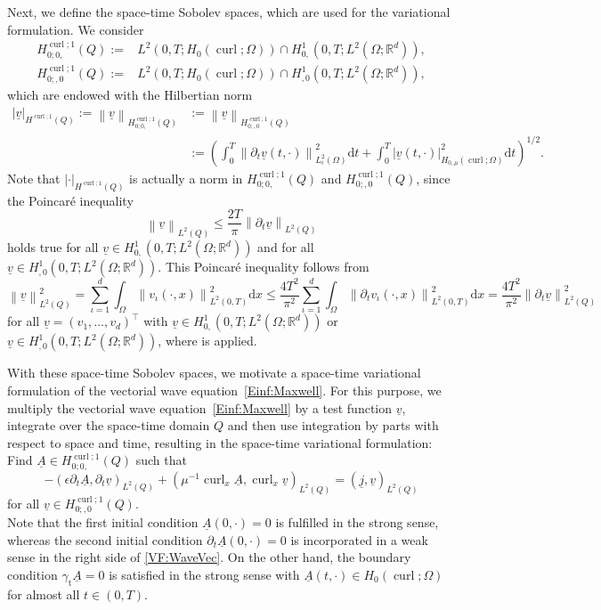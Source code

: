 \documentclass[a4paper,11pt]{article}
\newcommand{\R}{\mathbb R}
\newcommand{\cu}{\operatorname{curl}}
\newcommand{\trt}{\gamma_\mathrm{t}}
\renewcommand{\vec}[1]{\underline{#1}}
\newcommand{\abs}[1]{\left\lvert{#1}\right\rvert}
\newcommand{\norm}[1]{{\left\lVert{#1}\right\rVert}}
\begin{document}
Next, we define the space-time Sobolev spaces, which are used for the variational formulation. We consider
\begin{align}
	H^{\cu;1}_{0;0,}(Q) :=& L^2(0,T;H_0(\cu;\Omega))\cap H^1_{0,}(0,T;L^2(\Omega;\R^d)), \label{VF:Ansatzraum} \\
	H^{\cu;1}_{0;,0}(Q) :=& L^2(0,T;H_0(\cu;\Omega))\cap H^1_{,0}(0,T;L^2(\Omega;\R^d)), \label{VF:Testraum}
\end{align}
which are endowed with the Hilbertian norm
\begin{align*}
	\abs{\vec v}_{H^{\cu;1}(Q)} := \norm{\vec v}_{H^{\cu;1}_{0;0,}(Q)} &:= \norm{\vec v}_{H^{\cu;1}_{0;,0}(Q)} \\
	&:= \left( \int_0^T \norm{ \partial_t \vec v(t,\cdot) }_{{L^2_\epsilon(\Omega)}}^2 \mathrm dt + \int_0^T \abs{\vec v(t,\cdot)}_{H_{0,\mu}(\cu;\Omega)}^2 \mathrm dt \right)^{1/2}.
\end{align*}
Note that $\abs{\cdot}_{H^{\cu;1}(Q)}$ is actually a norm in $H^{\cu;1}_{0;0,}(Q)$ and $H^{\cu;1}_{0;,0}(Q)$, since the Poincaré inequality
\begin{equation*}
	\norm{\vec v}_{L^2(Q)} \leq \frac{2 T}{\pi} \norm{\partial_t \vec v}_{L^2(Q)}
\end{equation*}
holds true for all $\vec v \in  H^1_{0,}(0,T;L^2(\Omega;\R^d))$ and for all $\vec v \in  H^1_{,0}(0,T;L^2(\Omega;\R^d))$. This Poincaré inequality follows from
\begin{equation*}
	\norm{ \vec v }_{L^2(Q)}^2 = \sum_{\iota=1}^d \int_\Omega \norm{v_\iota(\cdot,x)}_{L^2(0,T)}^2 \mathrm dx \leq \frac{4 T^2}{\pi^2} \sum_{\iota=1}^d \int_\Omega \norm{\partial_t v_\iota(\cdot,x)}_{L^2(0,T)}^2 \mathrm dx =  \frac{4 T^2}{\pi^2} \norm{ \partial_t \vec v }_{L^2(Q)}^2
\end{equation*}
for all $\vec v = (v_1, \dots, v_d)^\top$ with $\vec v \in  H^1_{0,}(0,T;L^2(\Omega;\R^d))$ or $\vec v \in  H^1_{,0}(0,T;L^2(\Omega;\R^d))$, where \cite[Lemma~3.4.5]{ZankDissBuch2020} is applied.

With these space-time Sobolev spaces, we motivate a space-time variational formulation of the vectorial wave equation~\eqref{Einf:Maxwell}. For this purpose, we multiply the vectorial wave equation~\eqref{Einf:Maxwell} by a test function $\vec v$, integrate over the space-time domain $Q$ and then use integration by parts with respect to space and time, resulting in the space-time variational formulation:\\
Find $\vec A \in H^{\cu;1}_{0;0,} (Q)$ such that
\begin{equation} \label{VF:WaveVec}
	-(\epsilon\partial_t \vec A,\partial_t \vec v)_{L^2(Q)}+ (\mu^{-1} \cu_x \vec A,\cu_x \vec v)_{L^2(Q)} = (\vec j, \vec v)_{L^2(Q)}
\end{equation}
for all $\vec v \in H^{\cu;1}_{0;,0} (Q)$.\\
Note that the first initial condition $\vec A(0,\cdot) = 0$ is fulfilled in the strong sense, whereas the second initial condition $\partial_t \vec A(0,\cdot) = 0$ is incorporated in a weak sense in the right side of \eqref{VF:WaveVec}. On the other hand, the boundary condition $\trt\vec A = 0$ is satisfied in the strong sense with $\vec A(t,\cdot) \in H_0(\cu;\Omega)$ for almost all $t \in (0,T)$.
\end{document}
